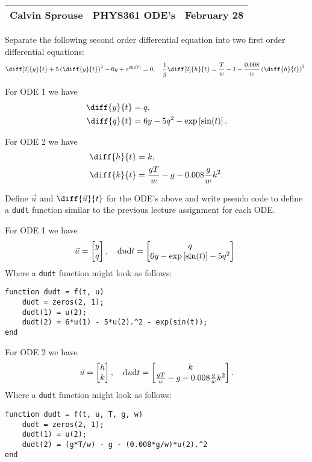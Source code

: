 \documentclass[a4paper, 12pt]{config/homework}
\begin{document}
\noindent
\begin{tabularx}{\textwidth}{>{\centering\arraybackslash}X>{\centering\arraybackslash}X>{\centering\arraybackslash}X}
Calvin Sprouse & PHYS361 ODE's & 2024 February 28\\
\midrule
\end{tabularx}

\vspace{\baselineskip}\noindent
Separate the following second order differential equation into two first order differential equations:
\[\diff[2]{y}{t} + 5\left(\diff{y}{t}\right)^2 - 6y + e^{\sin(t)} = 0, \quad
\frac{1}{g}\diff[2]{h}{t} = \frac{T}{w} - 1 - \frac{0.008}{w}\left(\diff{h}{t}\right)^2.\]

\noindent
For ODE 1 we have
\begin{align*}
\diff{y}{t} &= q, \\
\diff{q}{t} &= 6y - 5q^2 - \exp\left[\sin(t)\right].
\end{align*}

\noindent
For ODE 2 we have
\begin{align*}
\diff{h}{t} &= k, \\
\diff{k}{t} &= \frac{gT}{w} -g - 0.008\frac{g}{w}k^2.
\end{align*}

\vspace{\baselineskip}\noindent
Define \(\vec{u}\) and \(\diff{\vec{u}}{t}\) for the ODE's above and write pseudo code to define a \texttt{dudt} function similar to the previous lecture assignment for each ODE.

\noindent For ODE 1 we have
\[\vec{u} = \left[ \begin{matrix} y \\ q \end{matrix} \right], \quad \text{d}u\text{d}t = \left[ \begin{matrix} q \\ 6y - \exp\left[\sin(t)\right] - 5q^2 \end{matrix} \right].\]
Where a \texttt{dudt} function might look as follows:
\begin{verbatim}
function dudt = f(t, u)
    dudt = zeros(2, 1);
    dudt(1) = u(2);
    dudt(2) = 6*u(1) - 5*u(2).^2 - exp(sin(t));
end
\end{verbatim}

\noindent For ODE 2 we have
\[\vec{u} = \left[ \begin{matrix} h \\ k \end{matrix} \right], \quad \text{d}u\text{d}t = \left[ \begin{matrix} k \\ \frac{gT}{w} -g - 0.008\frac{g}{w}k^2 \end{matrix} \right].\]
Where a \texttt{dudt} function might look as follows:
\begin{verbatim}
function dudt = f(t, u, T, g, w)
    dudt = zeros(2, 1);
    dudt(1) = u(2);
    dudt(2) = (g*T/w) - g - (0.008*g/w)*u(2).^2
end
\end{verbatim}
\end{document}
